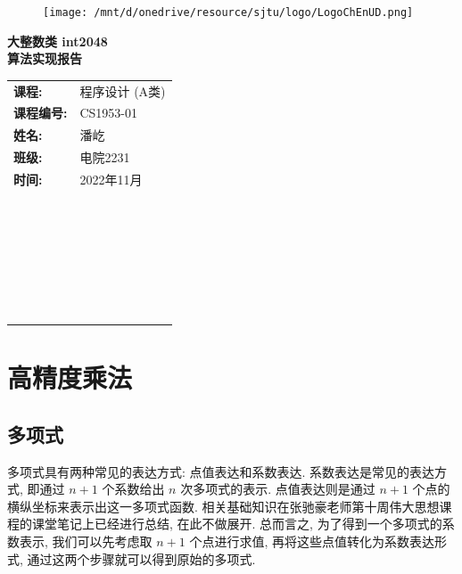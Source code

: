 \documentclass[UTF8, a4paper, 11pt]{ctexart}
\theoremstyle{definition}
\begin{document}
\thispagestyle{empty}

\begin{figure}[t]
    \centering
    \texttt{[image: /mnt/d/onedrive/resource/sjtu/logo/LogoChEnUD.png]}
\end{figure}

\vspace*{\fill}
\begin{center}
    \Huge\textbf{大整数类 int2048}\\
    \Huge\textbf{算法实现报告}
\end{center}
\vspace*{\fill}

\begin{table}[b]
    \centering
    \large
    \begin{tabular}{ll}
        \textbf{课程:}     & 程序设计 (A类) \\
        \textbf{课程编号:} & CS1953-01      \\
        \textbf{姓名:}     & 潘屹           \\
        \textbf{班级:}     & 电院2231       \\
        \textbf{时间:}     & 2022年11月     \\
        ~                                   \\
        ~                                   \\
        ~                                   \\
        ~                                   \\
        ~                                   \\
        ~                                   \\
    \end{tabular}
\end{table}

\newpage

\thispagestyle{empty}

\section{高精度乘法}

\subsection{多项式}

多项式具有两种常见的表达方式: 点值表达和系数表达. 系数表达是常见的表达方式, 即通过 $n+1$ 个系数给出 $n$ 次多项式的表示. 点值表达则是通过 $n+1$ 个点的横纵坐标来表示出这一多项式函数. 相关基础知识在张驰豪老师第十周伟大思想课程的课堂笔记上已经进行总结, 在此不做展开. 总而言之, 为了得到一个多项式的系数表示, 我们可以先考虑取 $n+1$ 个点进行求值, 再将这些点值转化为系数表达形式, 通过这两个步骤就可以得到原始的多项式.
\end{document}

